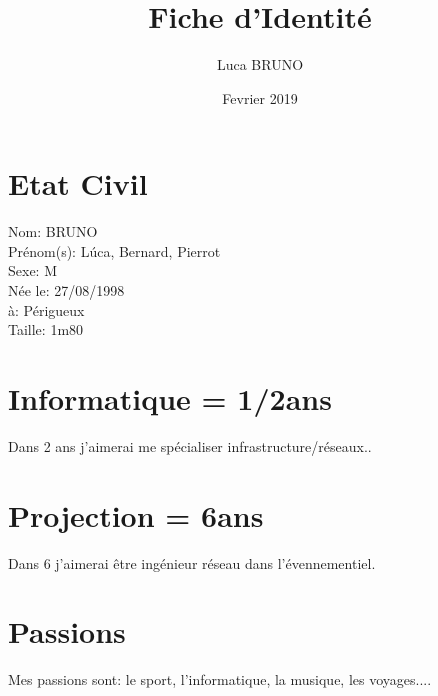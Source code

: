 \documentclass{article}
\title{Fiche d'Identité}
\author{Luca BRUNO}
\date{Fevrier 2019}
\begin{document}
\maketitle

\section{Etat Civil}
Nom: BRUNO
\\Prénom(s): Lúca, Bernard, Pierrot
\\Sexe: M
\\Née le: 27/08/1998
\\à: Périgueux
\\Taille: 1m80
\section{Informatique = 1/2ans}
Dans 2 ans j'aimerai me spécialiser infrastructure/réseaux..
\section{Projection = 6ans}
Dans 6 j'aimerai être ingénieur réseau dans l'évennementiel.
\section{Passions}
Mes passions sont: le sport, l'informatique, la musique, les voyages....
\end{document}
